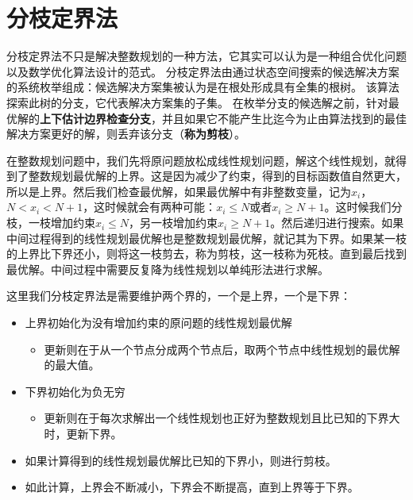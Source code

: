 \section{分枝定界法}
分枝定界法不只是解决整数规划的一种方法，它其实可以认为是一种组合优化问题以及数学优化算法设计的范式。 分枝定界法由通过状态空间搜索的候选解决方案的系统枚举组成：候选解决方案集被认为是在根处形成具有全集的根树。 该算法探索此树的分支，它代表解决方案集的子集。 在枚举分支的候选解之前，针对最优解的\textbf{上下估计边界检查分支}，并且如果它不能产生比迄今为止由算法找到的最佳解决方案更好的解，则丢弃该分支（\textbf{称为剪枝}）。

在整数规划问题中，我们先将原问题放松成线性规划问题，解这个线性规划，就得到了整数规划最优解的上界。这是因为减少了约束，得到的目标函数值自然更大，所以是上界。然后我们检查最优解，如果最优解中有非整数变量，记为$x_{i}$， $N < x_{i} < N+1$，这时候就会有两种可能：$x_{i} \le N$或者$x_{i} \ge N+1$。这时候我们分枝，一枝增加约束$x_{i} \le N$，另一枝增加约束$x_{i} \ge N+1$。然后递归进行搜索。如果中间过程得到的线性规划最优解也是整数规划最优解，就记其为下界。如果某一枝的上界比下界还小，则将这一枝剪去，称为剪枝，这一枝称为死枝。直到最后找到最优解。中间过程中需要反复降为线性规划以单纯形法进行求解。

这里我们分枝定界法是需要维护两个界的，一个是上界，一个是下界：
\begin{itemize}
\item 上界初始化为没有增加约束的原问题的线性规划最优解
  \begin{itemize}
	  \item 更新则在于从一个节点分成两个节点后，取两个节点中线性规划的最优解的最大值。
  \end{itemize}
\item 下界初始化为负无穷
  \begin{itemize}
	  \item 更新则在于每次求解出一个线性规划也正好为整数规划且比已知的下界大时，更新下界。
  \end{itemize}
\item 如果计算得到的线性规划最优解比已知的下界小，则进行剪枝。
\item 如此计算，上界会不断减小，下界会不断提高，直到上界等于下界。
\end{itemize}

